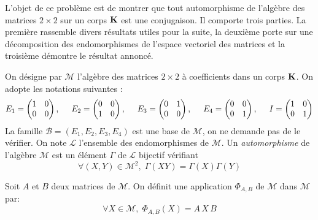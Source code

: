 L'objet de ce problème est de montrer que tout automorphisme de l'algèbre des matrices $2\times 2$ sur un corps $\mathbf{K}$ est une conjugaison.\newline
Il comporte trois parties. La première rassemble divers résultats utiles pour la suite, la deuxième porte sur une décomposition des endomorphismes de l'espace vectoriel des matrices et la troisième démontre le résultat annoncé.

On désigne par $\mathcal{M}$ l'algèbre des matrices $2\times 2$ à coefficients dans un corps $\mathbf{K}$. On adopte les notations suivantes :
\begin{displaymath}
 E_1=
\begin{pmatrix}
 1 & 0 \\ 0 & 0
\end{pmatrix},
\hspace{0,5cm}
 E_2=
\begin{pmatrix}
 0 & 0 \\ 1 & 0
\end{pmatrix},
\hspace{0,5cm}
 E_3=
\begin{pmatrix}
 0 & 1 \\ 0 & 0
\end{pmatrix},
\hspace{0,5cm}
 E_4=
\begin{pmatrix}
 0 & 0 \\ 0 & 1
\end{pmatrix},
\hspace{0,5cm}
 I=
\begin{pmatrix}
 1 & 0 \\ 0 & 1
\end{pmatrix}
\end{displaymath}
La famille $\mathcal B = (E_1,E_2,E_3,E_4)$ est une base de $\mathcal M$, on ne demande pas de le vérifier.\newline
On note $\mathcal{L}$ l'ensemble des endomorphismes de $\mathcal{M}$. Un \emph{automorphisme} de l'algèbre $\mathcal{M}$ est un élément $\Gamma$ de $\mathcal L$ bijectif vérifiant
\begin{displaymath}
 \forall (X,Y)\in\mathcal{M}^2,\; \Gamma(XY) = \Gamma(X)\Gamma(Y)
\end{displaymath}

Soit $A$ et $B$ deux matrices de $\mathcal{M}$. On définit une application $\Phi_{A,B}$ de $\mathcal{M}$ dans $\mathcal{M}$ par:
\begin{displaymath}
 \forall X\in \mathcal{M},\;\Phi_{A,B}(X) = A\,X\,B
\end{displaymath}


